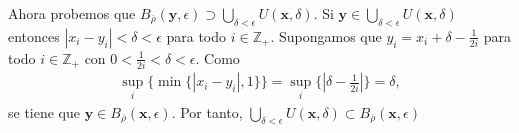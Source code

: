 \documentclass{article}
\newcommand{\vect}[1]{\boldsymbol{#1}}
\begin{document}
Ahora probemos que $B_{\overline{\rho}}(\vect{y},\epsilon)\supset\bigcup_{\delta<\epsilon}U(\vect{x},\delta)$. Si $\vect{y}\in \bigcup_{\delta<\epsilon}U(\vect{x},\delta)$ entonces $|x_i-y_i|<\delta<\epsilon$ para todo $i\in\mathbb{Z}_{+}$. Supongamos que $y_i=x_i+\delta-\frac{1}{2i}$ para todo $i\in\mathbb{Z}_{+}$ con $0<\frac{1}{2i}<\delta<\epsilon$. Como \begin{eqnarray}
\sup_i\{\min\{|x_i-y_i|,1\}\}=\sup_i\{|\delta-\frac{1}{2i}|\}=\delta,\nonumber
\end{eqnarray}
se tiene que $\vect{y}\in B_{\overline{\rho}}(\vect{x},\epsilon)$. Por tanto, $\bigcup_{\delta<\epsilon}U(\vect{x},\delta)\subset B_{\overline{\rho}}(\vect{x},\epsilon)$
\end{document}
